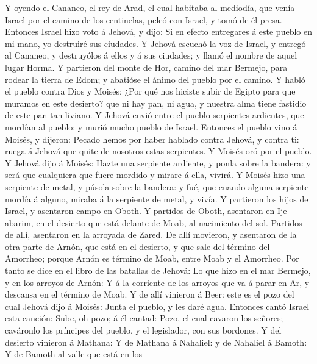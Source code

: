  Y oyendo el Cananeo, el rey de Arad, el cual habitaba al
mediodía, que venía Israel por el camino de los centinelas, peleó con
Israel, y tomó de él presa.  Entonces Israel hizo voto á
Jehová, y dijo: Si en efecto entregares á este pueblo en mi mano, yo
destruiré sus ciudades.  Y Jehová escuchó la voz de
Israel, y entregó al Cananeo, y destruyólos á ellos y á sus ciudades; y
llamó el nombre de aquel lugar Horma.  Y partieron del
monte de Hor, camino del mar Bermejo, para rodear la tierra de Edom; y
abatióse el ánimo del pueblo por el camino.  Y habló el
pueblo contra Dios y Moisés: ¿Por qué nos hiciste subir de Egipto para
que muramos en este desierto? que ni hay pan, ni agua, y nuestra alma
tiene fastidio de este pan tan liviano.  Y Jehová envió
entre el pueblo serpientes ardientes, que mordían al pueblo: y murió
mucho pueblo de Israel.  Entonces el pueblo vino á Moisés,
y dijeron: Pecado hemos por haber hablado contra Jehová, y contra ti:
ruega á Jehová que quite de nosotros estas serpientes. Y Moisés oró por
el pueblo.  Y Jehová dijo á Moisés: Hazte una serpiente
ardiente, y ponla sobre la bandera: y será que cualquiera que fuere
mordido y mirare á ella, vivirá.  Y Moisés hizo una
serpiente de metal, y púsola sobre la bandera: y fué, que cuando alguna
serpiente mordía á alguno, miraba á la serpiente de metal, y vivía.
 Y partieron los hijos de Israel, y asentaron campo en
Oboth.  Y partidos de Oboth, asentaron en Ije-abarim, en
el desierto que está delante de Moab, al nacimiento del sol.
 Partidos de allí, asentaron en la arroyada de Zared.
 De allí movieron, y asentaron de la otra parte de Arnón,
que está en el desierto, y que sale del término del Amorrheo; porque
Arnón es término de Moab, entre Moab y el Amorrheo.  Por
tanto se dice en el libro de las batallas de Jehová: Lo que hizo en el
mar Bermejo, y en los arroyos de Arnón:  Y á la corriente
de los arroyos que va á parar en Ar, y descansa en el término de Moab.
 Y de allí vinieron á Beer: este es el pozo del cual
Jehová dijo á Moisés: Junta el pueblo, y les daré agua. 
Entonces cantó Israel esta canción: Sube, oh pozo; á él cantad:
 Pozo, el cual cavaron los señores; caváronlo los
príncipes del pueblo, y el legislador, con sus bordones. Y del desierto
vinieron á Mathana:  Y de Mathana á Nahaliel: y de
Nahaliel á Bamoth:  Y de Bamoth al valle que está en los
